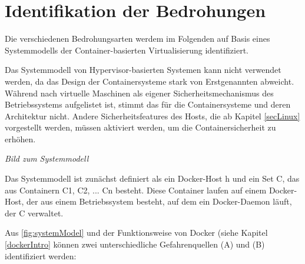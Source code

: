 \documentclass[../main.tex]{subfiles}
\begin{document}
  \section{Identifikation der Bedrohungen}
    Die verschiedenen Bedrohungsarten werdem im Folgenden auf Basis eines Systemmodells der Container-basierten Virtualisierung identifiziert.

    Das Systemmodell von Hypervisor-basierten Systemen kann nicht verwendet werden, da das Design der Containersysteme stark von Erstgenannten abweicht. Während nach \cite[S.125]{CISSP} virtuelle Maschinen als eigener Sicherheitsmechanismus des Betriebssystems aufgelistet ist, stimmt das für die Containersysteme und deren Architektur nicht. Andere Sicherheitsfeatures des Hosts, die ab Kapitel \ref{secLinux} vorgestellt werden, müssen aktiviert werden, um die Containersicherheit zu erhöhen.

    \emph{Bild zum Systemmodell}

    Das Systemmodell ist zunächst definiert als ein Docker-Host h und ein Set C, das aus Containern C1, C2, ... Cn besteht. Diese Container laufen auf einem Docker-Host, der aus einem Betriebssystem besteht, auf dem ein Docker-Daemon läuft, der C verwaltet.

    Aus \fig \ref{fig:systemModel} und der Funktionsweise von Docker (siehe Kapitel \ref{dockerIntro} können zwei unterschiedliche Gefahrenquellen (A) und (B) identifiziert werden:
\end{document}
